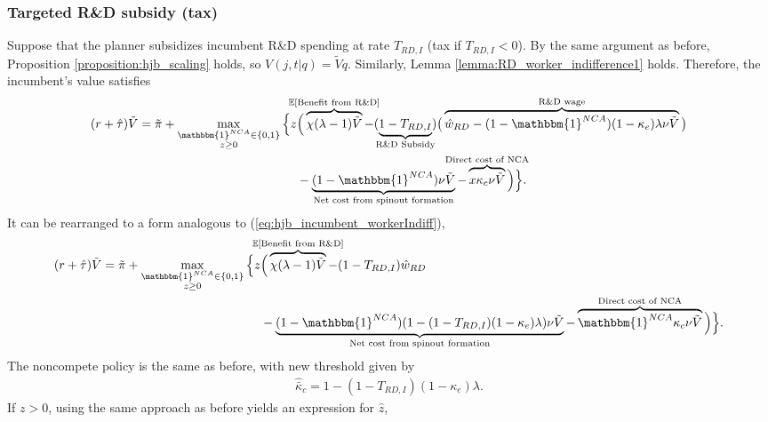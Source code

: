 \documentclass[ecta,nameyear,draft]{econsocart}
\theoremstyle{plain}
\theoremstyle{remark}
\begin{document}
\begin{appendix}
\subsubsection{Targeted R\&D subsidy (tax)}\label{appendix:model:efficiencyderivations:OIRDtax}

Suppose that the planner subsidizes incumbent R\&D spending at rate $T_{RD,I}$ (tax if $T_{RD,I} < 0$). By the same argument as before, Proposition \ref{proposition:hjb_scaling} holds, so $V(j,t|q) = \tilde{V}q$. Similarly, Lemma \ref{lemma:RD_worker_indifference1} holds. Therefore, the incumbent's value satisfies
\begin{align}
	(r + \hat{\tau}) \tilde{V} = \tilde{\pi} + \max_{\substack{\mathbbm{1}^{NCA} \in \{0,1\} \\ z \ge 0}} \Big\{z &\Big( \overbrace{\chi (\lambda - 1) \tilde{V}}^{\mathclap{\mathbb{E}[\textrm{Benefit from R\&D}]}}- (\underbrace{1-T_{RD,I}}_{\mathclap{\text{R\&D Subsidy}}}) \big( \overbrace{\hat{w}_{RD} - (1-\mathbbm{1}^{NCA})(1-\kappa_e)\lambda \nu \tilde{V}}^{\mathclap{\text{R\&D wage}}}\big) \label{eq:hjb_incumbent_RDsubsidyTargeted} \nonumber \\ 
	&-  \underbrace{(1-\mathbbm{1}^{NCA}) \nu \tilde{V}}_{\mathclap{\text{Net cost from spinout formation}}} - \overbrace{x \kappa_{c} \nu \tilde{V}}^{\mathclap{\text{Direct cost of NCA}}}\Big) \Big\}.
\end{align}
It can be rearranged to a form analogous to (\ref{eq:hjb_incumbent_workerIndiff}),
\begin{align}
	(r + \hat{\tau}) \tilde{V} = \tilde{\pi} + \max_{\substack{\mathbbm{1}^{NCA} \in \{0,1\} \\ z \ge 0}} \Big\{z &\Big( \overbrace{\chi (\lambda - 1) \tilde{V}}^{\mathclap{\mathbb{E}[\textrm{Benefit from R\&D}]}}- (1-T_{RD,I}) \hat{w}_{RD} \\
	&-  \underbrace{(1-\mathbbm{1}^{NCA})(1 - (1-T_{RD,I})(1-\kappa_{e})\lambda)\nu \tilde{V}}_{\mathclap{\text{Net cost from spinout formation}}} - \overbrace{\mathbbm{1}^{NCA} \kappa_{c} \nu \tilde{V}}^{\mathclap{\text{Direct cost of NCA}}}\Big) \Big\}. \label{eq:hjb_incumbent_RDsubsidyTargeted_2}
\end{align}
The noncompete policy is the same as before, with new threshold given by 
\begin{align}
	\hat{\bar{\kappa}}_c = 1 - (1-T_{RD,I})(1-\kappa_e)\lambda.
\end{align} 
If $z > 0$, using the same approach as before yields an expression for $\hat{z}$, 
\begin{align}

\end{align}
\end{appendix}
\end{document}
